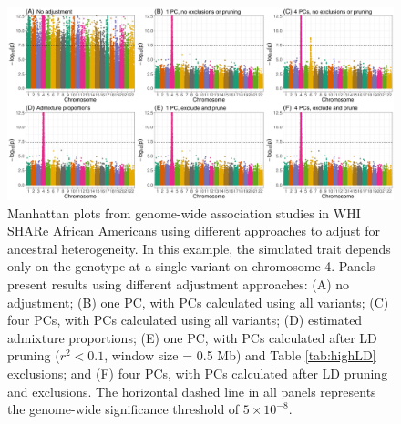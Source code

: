 \documentclass[12pt]{article}
\begin{document}
\begin{figure}
\includegraphics[width=\textwidth]{figs/finalfigs/fig4_WHI_manh_gwas_70}
\caption{Manhattan plots from genome-wide association studies in WHI SHARe African Americans using different approaches to adjust for ancestral heterogeneity. In this example, the simulated trait depends only on the genotype at a single variant on chromosome 4. Panels present results using different adjustment approaches: (A) no adjustment; (B) one PC, with PCs calculated using all variants; (C) four PCs, with PCs calculated using all variants; (D) estimated admixture proportions; (E) one PC, with PCs calculated after LD pruning ($r^2 < 0.1$, window size = 0.5 Mb) and Table \ref{tab:highLD} exclusions; and (F) four PCs, with PCs calculated after LD pruning and exclusions. The horizontal dashed line in all panels represents the genome-wide significance threshold of $5 \times 10^{-8}$.}
\label{fig:manh}
\end{figure}
\end{document}
